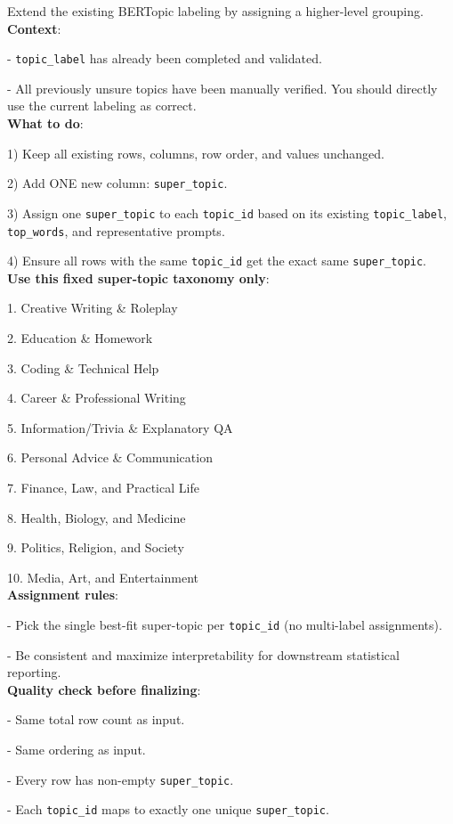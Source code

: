 \documentclass[11pt]{article}
\begin{document}
\begin{tcolorbox}[
  enhanced jigsaw,
  colback=gray!5,
  colframe=gray!40,
  title=Prompt for Super Topic Assignment,
  boxsep=3pt,
  left=3pt,
  right=3pt,
  top=3pt,
  bottom=3pt,
  parskip=0pt,
  breakable,
  break at=-\baselineskip/0pt,
  height fixed for=middle,
  pad at break=1mm
]

Extend the existing BERTopic labeling by assigning a higher-level grouping.\\

\textbf{Context}:

- \texttt{topic\_label} has already been completed and validated.

- All previously unsure topics have been manually verified. You should directly use the current labeling as correct.\\

\textbf{What to do}:

1) Keep all existing rows, columns, row order, and values unchanged.

2) Add ONE new column: \texttt{super\_topic}.

3) Assign one \texttt{super\_topic} to each \texttt{topic\_id} based on its existing \texttt{topic\_label}, \texttt{top\_words}, and representative prompts.

4) Ensure all rows with the same \texttt{topic\_id} get the exact same \texttt{super\_topic}.\\

\textbf{Use this fixed super-topic taxonomy only}:

1. Creative Writing \& Roleplay 

2. Education \& Homework 

3. Coding \& Technical Help 

4. Career \& Professional Writing 

5. Information/Trivia \& Explanatory QA

6. Personal Advice \& Communication 

7. Finance, Law, and Practical Life 

8. Health, Biology, and Medicine 

9. Politics, Religion, and Society

10. Media, Art, and Entertainment\\

\textbf{Assignment rules}:

- Pick the single best-fit super-topic per \texttt{topic\_id} (no multi-label assignments).

- Be consistent and maximize interpretability for downstream statistical reporting.\\

\textbf{Quality check before finalizing}:

- Same total row count as input.

- Same ordering as input.

- Every row has non-empty \texttt{super\_topic}.

- Each \texttt{topic\_id} maps to exactly one unique \texttt{super\_topic}.

\end{tcolorbox}
\end{document}
